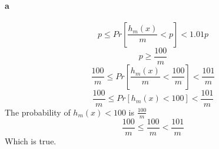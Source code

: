 \paragraph{a}
\begin{equation}
    p \le Pr\left[ \frac{h_{m}(x)}{m} < p \right] < 1.01p
\end{equation}
\begin{equation}
    p \ge \frac{100}{m}
\end{equation}
\begin{equation}
    \frac{100}{m} \le Pr\left[ \frac{h_{m}(x)}{m} < \frac{100}{m} \right] < \frac{101}{m}
\end{equation}
\begin{equation}
    \frac{100}{m} \le Pr\left[ h_{m}(x) < 100 \right] < \frac{101}{m}
\end{equation}
The probability of $h_m(x) < 100$ is $\frac{100}{m}$
\begin{equation}
    \frac{100}{m} \le \frac{100}{m} < \frac{101}{m}
\end{equation}
Which is true.
